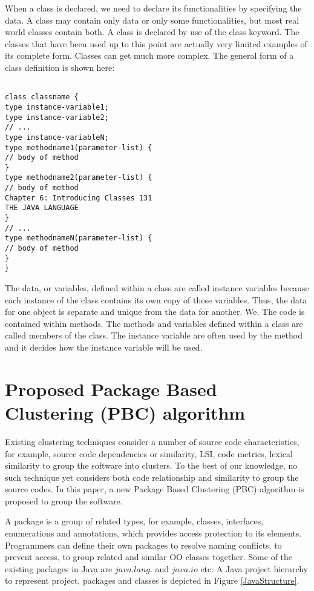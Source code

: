 \documentclass[12pt]{report}
\begin{document}
When a class is declared, we need to declare its functionalities by specifying the data. A class may contain only data or only some functionalities, but most real world classes contain both. A class is declared by use of the class keyword. The classes that have been used up to this point are actually very limited examples of its complete form. Classes can get much more complex. The general form of a class definition is shown here:

\begin{lstlisting}

class classname {
type instance-variable1;
type instance-variable2;
// ...
type instance-variableN;
type methodname1(parameter-list) {
// body of method
}
type methodname2(parameter-list) {
// body of method
Chapter 6: Introducing Classes 131
THE JAVA LANGUAGE
}
// ...
type methodnameN(parameter-list) {
// body of method
}
}

\end{lstlisting}

The data, or variables, defined within a class are called instance variables because each instance of the class contains its own copy of these variables. Thus, the data for one object is separate and unique from the data for another. We. The code is contained within methods. The methods and variables defined within a class are called members of the class. The instance variable are often used by the method and it decides how the instance variable will be used.  

\section{Proposed Package Based Clustering (PBC) algorithm}

Existing clustering techniques consider a number of source code characteristics, for example, source code dependencies or similarity, LSI, code metrics, lexical similarity to group the software into clusters. To the best of our knowledge, no such technique yet considers both code relationship and similarity to group the source codes. In this paper, a new Package Based Clustering (PBC) algorithm is proposed to group the software. 

A package is a group of related types, for example, classes, interfaces, enumerations and annotations, which provides access protection to its elements. Programmers can define their own packages to resolve naming conflicts, to prevent access, to group related and similar OO classes together. Some of the existing packages in Java are $java.lang.$ and $java.io$ etc. A Java project hierarchy to represent project, packages and classes is depicted in Figure \ref{JavaStructure}.
\end{document}
